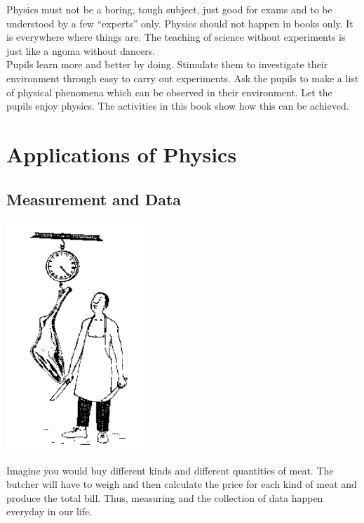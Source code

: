 \begin{multicols}{2}
Physics must not be a boring, tough subject, just good for exams and to be understood by a
few ``experts'' only. Physics should not happen in books only. It is everywhere where things
are. The teaching of science without experiments is just like a ngoma without dancers.\\

Pupils learn more and better by doing. Stimulate them to investigate their environment
through easy to carry out experiments. Ask the pupils to make a list of physical phenomena
which can be observed in their environment. Let the pupils enjoy physics. The activities in this book
show how this can be achieved.

\vfill
\columnbreak



\section*{Applications of Physics}


\subsection{Measurement and Data}

\begin{center}
\includegraphics[width=0.4\textwidth]{./img/source/butcher.png}
\end{center}

Imagine you would buy different kinds and different quantities of meat. The butcher will have
to weigh and then calculate the price for each kind of meat and produce the total bill. Thus,
measuring and the collection of data happen everyday in our life.\\


\end{multicols}
